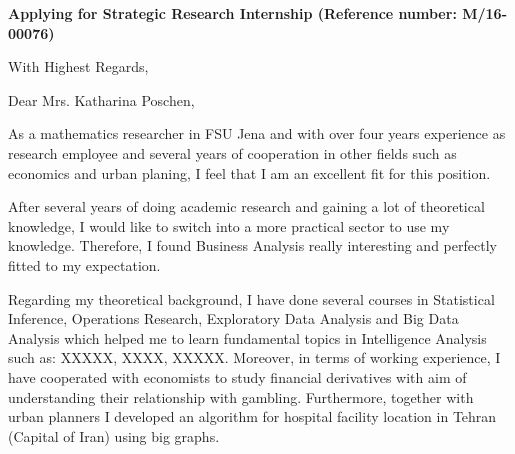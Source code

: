 \documentclass[11pt,a4paper,sans]{moderncv}        %
\title{}                               %
\begin{document}
\date{May 17, 2016}
\opening{\textbf{Applying for  Strategic Research Internship (Reference number: M/16-00076)}}
\closing{With Highest Regards,}
\makelettertitle

Dear Mrs. Katharina Poschen,

As a mathematics researcher in FSU Jena and with over four years experience as research employee and several years of cooperation in other fields such as economics and urban planing, I feel that I am an excellent fit for this position.



After several years of doing academic research and gaining a lot of theoretical knowledge, I would like to switch into a more practical sector to use my knowledge. Therefore, I found Business Analysis really interesting and perfectly fitted to my expectation.

Regarding my theoretical background, I have done several courses in Statistical Inference, Operations Research, Exploratory Data Analysis and Big Data Analysis which helped me to learn fundamental topics in Intelligence Analysis such as: XXXXX, XXXX, XXXXX. Moreover, in terms of working experience, I have cooperated with economists to study financial derivatives with aim of understanding their relationship with gambling. Furthermore, together with urban planners I developed an algorithm for hospital facility location in Tehran (Capital of Iran) using big graphs.





\end{document}
